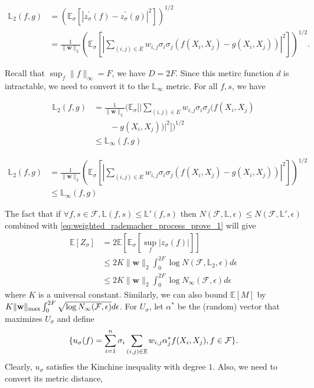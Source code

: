 \documentclass[letterpaper]{article} %
\def\DoubleColumn{}
\def\DoubleColumnEnd{}
\def\SingleColumn{}
\def\SingleColumnEnd{}
\newcommand{\E}{\mathbb{E}}
\newcommand{\weight}{\mathbf{w}}
\newcommand{\rademacher}{\sigma}
\newcommand{\pair}[1]{(#1)}
\newcommand{\lebesgue}{\mathbb{L}}
\begin{document}
\DoubleColumnEnd
\SingleColumn
\begin{align*}
    \lebesgue{}_2(f,g)&=(\E_\rademacher[|z^\prime_\rademacher(f)-z^\prime_\rademacher(g)|^2])^{1/2}\\
    &=\frac{1}{\|\weight{}\|_2}(\E_\rademacher[|\sum_{\pair{i,j}\in E}w_{i,j}\rademacher_i\rademacher_j(f(X_i,X_j)-g(X_i,X_j))|^2])^{1/2}.
\end{align*}
\SingleColumnEnd
Recall that $\sup_f \|f\|_\infty = F$, we have $D= 2F$.
Since this metirc function $d$ is intractable, we need to convert it to the $\lebesgue_\infty$ metric. For all $f,s$, we have
\DoubleColumn
\begin{align*}
    \lebesgue{}_2(f,g)&=\frac{1}{\|\weight{}\|_2}(\E_\rademacher[|\sum_{\pair{i,j}\in E}w_{i,j}\rademacher_i\rademacher_j(f(X_i,X_j)\\
    &\qquad-g(X_i,X_j))|^2])^{1/2}\\
    &\le \lebesgue_\infty(f,g)
\end{align*}
\DoubleColumnEnd
\SingleColumn
\begin{align*}
    \lebesgue{}_2(f,g)&=\frac{1}{\|\weight{}\|_2}(\E_\rademacher[|\sum_{\pair{i,j}\in E}w_{i,j}\rademacher_i\rademacher_j(f(X_i,X_j)-g(X_i,X_j))|^2])^{1/2}\\
    &\le \lebesgue_\infty(f,g)
\end{align*}
\SingleColumnEnd
The fact that if $\forall f,s\in\mathcal F, \lebesgue{}(f,s)\le \lebesgue{}'(f,s)$ then $N(\mathcal F,\lebesgue{},\epsilon)\le N(\mathcal F, \lebesgue{}',\epsilon)$ combined with \eqref{eq:weighted_rademacher_process_prove_1} will give
\begin{align*}
    \E[Z_\rademacher]&= 2\E[\E_\rademacher[\sup_f|z_\rademacher(f)|]]\\
    &\le 2K\|\weight{}\|_2\int_0^{2F}\log N(\mathcal F,\lebesgue{}_2,\epsilon)d\epsilon\\
    &\le 2K\|\weight{}\|_2\int_0^{2F}\log N_\infty(\mathcal F, \epsilon)d\epsilon
\end{align*}
where $K$ is a universal constant. Similarly, we can also bound $\E[M]$ by $K\|\weight{}\|_{\max}\linebreak\int_0^{2F}\sqrt{\log N_\infty(\mathcal F, \epsilon)}d\epsilon$. 
For $U_\rademacher$, let $\alpha^*$ be the (random) vector that maximizes $U_\rademacher$ and define
\[\{u_\rademacher(f) = \sum_{i=1}^n\rademacher_i\sum_{\pair{i,j}\in\E}w_{i,j}\alpha_j^*\linebreak f(X_i,X_j),f\in\mathcal{F}\}.\]
Clearly, $u_\rademacher$ satisfies the Kinchine inequality with degree $1$. Also, we need to convert its metric distance, 
\end{document}
